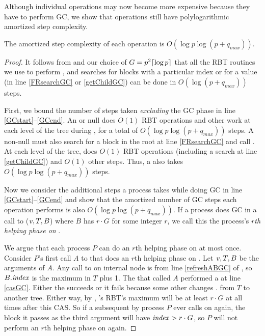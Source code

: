 
Although individual operations may now become more expensive because they have to perform GC,
we show that operations still have polylogarithmic amortized step complexity.

\begin{mytheorem}
The amortized step complexity of each operation is $O(\log p \log(p+q_{max}))$.
\end{mytheorem}
\begin{proof}
It follows from  and our choice of $G=p^2\lceil \log p \rceil$
that all the RBT routines we use to perform ,  and searches for
blocks with a particular index or for a  value (in line \ref{FRsearchGC} or \ref{getChildGC}) can  be done in $O(\log(p+q_{max}))$ steps.

First, we bound the number of steps taken \emph{excluding} the GC phase in line \ref{GCstart}--\ref{GCend}.
An  or null  does $O(1)$ RBT operations and other work at each level of the tree during ,
for a total of $O(\log p \log(p+q_{max}))$ steps.
A non-null  must also search for a block in the root at line \ref{FRsearchGC}
and call .  At each level of the tree,  does $O(1)$ RBT operations (including a search at line \ref{getChildGC}) and $O(1)$ other steps.
Thus, a  also takes $O(\log p \log(p+q_{max}))$ steps.

Now we consider the additional steps a process takes while doing GC in line \ref{GCstart}--\ref{GCend}
and show that the amortized number of GC steps each operation performs is also $O(\log p\log(p+q_{max}))$.
If a process does GC in a call to ($\mbox{\textnormal{\textit{v}}},T,B$) where $B$ has  $r\cdot G$ for some integer $r$, we call this the process's \emph{$r$th helping phase on }.

We argue that each process $P$ can do an $r$th helping phase on  at most once.
Consider $P$'s first call $A$ to  that does an $r$th helping phase on .
Let $\mbox{\textnormal{\textit{v}}},T,B$ be the arguments of $A$.
Any call to  on internal node  is from line \ref{refreshABGC} of , so $B.\mbox{\textit{index}}$
is the maximum  in $T$ plus 1.
The  that called $A$ performed a  at line \ref{casGC}.  Either the  succeeds
or it fails because 
some other  changes . from $T$ to another tree.
Either way, by , 's RBT's maximum  will be at least $r\cdot G$ at all times
after this CAS.
So if a subsequent  by process $P$ 
ever calls  on  again, the block it passes as the third argument
will have $\mbox{\textit{index}}>r\cdot G$, so $P$ will not perform an $r$th helping phase on  again.


\end{proof}
